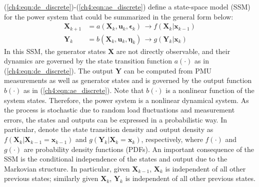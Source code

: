 (\ref{ch4:eqn:de_discrete})-(\ref{ch4:eqn:ae_discrete}) define a state-space model (SSM) for the power system that could be summarized in the general form below:
\begin{subequations}
\label{ch4:eqn:general_ssm}
\begin{align}
\boldsymbol{X}_{k+1} &= a(\boldsymbol{X}_{k}, \boldsymbol{u}_{k}, \boldsymbol{\epsilon}_{k}) \, \rightarrow f(\boldsymbol{X}_{k}|\boldsymbol{x}_{k-1}) \\ 
\boldsymbol{Y}_{k} &= b(\boldsymbol{X}_{k}, \boldsymbol{u}_{k}, \boldsymbol{\eta}_{k}) \, \rightarrow g(\boldsymbol{Y}_{k} | \boldsymbol{x}_{k})
\end{align}
\end{subequations}
In this SSM, the generator states $\boldsymbol{X}$ are not directly observable, and their dynamics are governed by the state transition function $a(\cdot)$ as in (\ref{ch4:eqn:de_discrete}). The output $\boldsymbol{Y}$ can be computed from PMU measurements as well as generator states and is governed by the output function $b(\cdot)$ as in (\ref{ch4:eqn:ae_discrete}). Note that $b(\cdot)$ is a nonlinear function of the system states. Therefore, the power system is a nonlinear dynamical system. As the process is stochastic due to random load fluctuations and measurement errors, the states and outputs can be expressed in a probabilistic way. In particular, denote the state transition density and output density as $f(\boldsymbol{X}_{k}|\boldsymbol{X}_{k-1}=\boldsymbol{x}_{k-1})$ and $g(\boldsymbol{Y}_{k} |\boldsymbol{X}_{k}=\boldsymbol{x}_{k})$, respectively, where $f(\cdot)$ and $g(\cdot)$ are probability density functions (PDFs). An important consequence of the SSM is the conditional independence of the states and output due to the Markovian structure. In particular, given $\boldsymbol{X}_{k-1}$, $\boldsymbol{X}_k$ is independent of all other previous states; similarly given $\boldsymbol{X}_{k}$, $\boldsymbol{Y}_{k}$ is independent of all other previous states.


